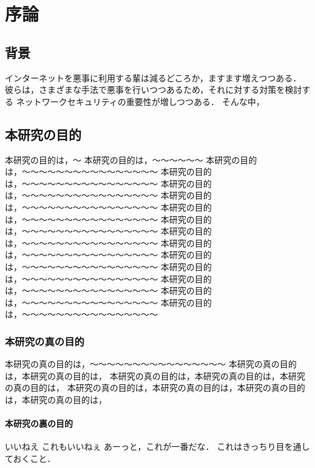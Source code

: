 \chapter{序論}\label{chap:introduction}

\section{背景}
インターネットを悪事に利用する輩は減るどころか，ますます増えつつある．
彼らは，さまざまな手法で悪事を行いつつあるため，それに対する対策を検討する
ネットワークセキュリティの重要性が増しつつある\cite{web-kinme:2016}．
そんな中，

\section{本研究の目的}

本研究の目的は，〜
本研究の目的は，〜〜〜〜〜〜
本研究の目的は，〜〜〜〜〜〜〜〜〜〜〜〜〜〜〜〜
本研究の目的は，〜〜〜〜〜〜〜〜〜〜〜〜〜〜〜〜
本研究の目的は，〜〜〜〜〜〜〜〜〜〜〜〜〜〜〜〜
本研究の目的は，〜〜〜〜〜〜〜〜〜〜〜〜〜〜〜〜
本研究の目的は，〜〜〜〜〜〜〜〜〜〜〜〜〜〜〜〜
本研究の目的は，〜〜〜〜〜〜〜〜〜〜〜〜〜〜〜〜
本研究の目的は，〜〜〜〜〜〜〜〜〜〜〜〜〜〜〜〜
本研究の目的は，〜〜〜〜〜〜〜〜〜〜〜〜〜〜〜〜
本研究の目的は，〜〜〜〜〜〜〜〜〜〜〜〜〜〜〜〜
本研究の目的は，〜〜〜〜〜〜〜〜〜〜〜〜〜〜〜〜
本研究の目的は，〜〜〜〜〜〜〜〜〜〜〜〜〜〜〜〜
本研究の目的は，〜〜〜〜〜〜〜〜〜〜〜〜〜〜〜〜
本研究の目的は，〜〜〜〜〜〜〜〜〜〜〜〜〜〜〜〜

\subsection{本研究の真の目的}
\label{subsec:ura}

本研究の真の目的は，〜〜〜〜〜〜〜〜〜〜〜〜〜〜〜〜
本研究の真の目的は，本研究の真の目的は，
本研究の真の目的は，本研究の真の目的は，本研究の真の目的は，
本研究の真の目的は，本研究の真の目的は，本研究の真の目的は，本研究の真の目的は，

\subsubsection{本研究の裏の目的}

いいねえ\cite{kasama:2011}
これもいいねぇ\cite{matsunaka:2013}
あーっと，これが一番だな\cite{Deterding:2011}．
これはきっちり目を通しておくこと．\cite{IPA}

\newpage


